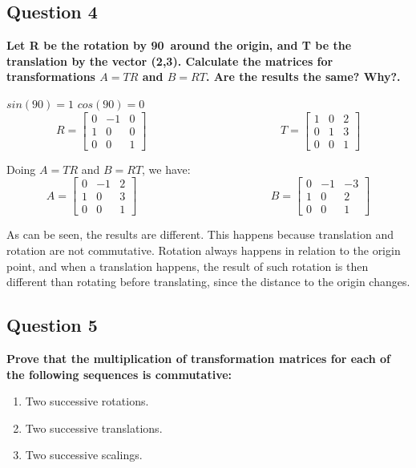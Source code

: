 \documentclass[12pt]{article}
\begin{document}
\subsection*{Question 4}
{\bfseries Let R be the rotation by 90\degree~around the origin, and T be the translation by the vector (2,3). Calculate the matrices for transformations $A=TR$ and $B=RT$. Are the results the same? Why?.}

$sin(90) = 1$ \hspace{1cm} $cos(90) = 0$
\begin{equation*}
    R=
    \begin{bmatrix}
    0 & -1 & 0 \\
    1 & 0 & 0 \\
    0 & 0 & 1
    \end{bmatrix}
    \hspace{5cm}
    T=
    \begin{bmatrix}
    1 & 0 & 2 \\
    0 & 1 & 3 \\
    0 & 0 & 1
    \end{bmatrix}
\end{equation*}

Doing $A=TR$ and $B=RT$, we have:
\begin{equation*}
    A=
    \begin{bmatrix}
    0 & -1 & 2 \\
    1 & 0 & 3 \\
    0 & 0 & 1
    \end{bmatrix}
    \hspace{5cm}
    B=
    \begin{bmatrix}
    0 & -1 & -3 \\
    1 & 0 & 2 \\
    0 & 0 & 1
    \end{bmatrix}
\end{equation*}

As can be seen, the results are different. This happens because translation and rotation are not commutative. Rotation always happens in relation to the origin point, and when a translation happens, the result of such rotation is then different than rotating before translating, since the distance to the origin changes.

\subsection*{Question 5}
{\bfseries Prove that the multiplication of transformation matrices for each of the following sequences is commutative:
\begin{enumerate}[label=\alph*)]
    \item Two successive rotations.
    \item Two successive translations.
    \item Two successive scalings.
\end{enumerate}
}
\end{document}
